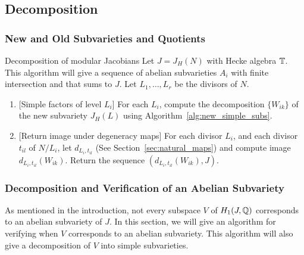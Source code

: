 \documentclass{article}
\begin{document}
\subsection{Decomposition}
\subsubsection{New and Old Subvarieties and Quotients}

\begin{algorithm}{Decomposition of modular Jacobians}
    \label{alg:decomp_jacobian}
    Let $J=J_H(N)$ with Hecke algebra $\mathbb{T}$. This algorithm will give a sequence
    of abelian subvarieties $A_i$ with finite intersection and that sums to
    $J$. Let $L_1,\ldots, L_r$ be the divisors of $N$.
    \begin{enumerate}
        \item{} [Simple factors of level $L_i$]
            For each $L_i$, compute the decomposition $\{W_{ik}\}$ of the new
            subvariety $J_H(L)$ using Algorithm~\ref{alg:new_simple_subs}.
        \item{} [Return image under degeneracy maps]
            For each divisor $L_i$, and each divisor $t_{il}$ of $N/L_i$, let
            $d_{L_i, t_{il}}$ (See Section~\ref{sec:natural_maps}) and compute
            image $d_{L_i, t_{il}}(W_{ik})$. Return the sequence $(d_{L_i,
            t_{il}}(W_{ik}), J)$.
    \end{enumerate}
\end{algorithm}

\subsubsection{Decomposition and Verification of an Abelian Subvariety}
\label{sec:decomp_verify}

As mentioned in the introduction, not every subspace $V$ of $H_1(J, \mathbb{Q})$
corresponds to an abelian subvariety of $J$. In this section, we will give an
algorithm for verifying when $V$ corresponds to an abelian subvariety. This
algorithm will also give a decomposition of $V$ into simple subvarieties.
\end{document}
